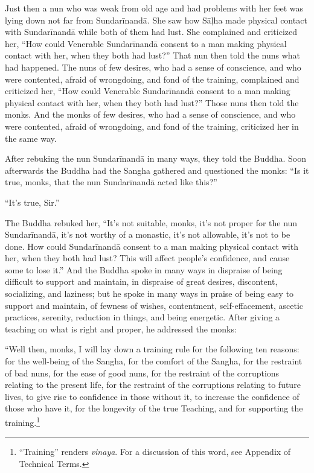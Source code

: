 \documentclass[12pt,openany]{book}%
\begin{document}
Just then a nun who was weak from old age and had problems with her feet was lying down not far from \textsanskrit{Sundarīnandā}. She saw how \textsanskrit{Sāḷha} made physical contact with \textsanskrit{Sundarīnandā} while both of them had lust. She complained and criticized her, “How could Venerable \textsanskrit{Sundarīnandā} consent to a man making physical contact with her, when they both had lust?” That nun then told the nuns what had happened. The nuns of few desires, who had a sense of conscience, and who were contented, afraid of wrongdoing, and fond of the training, complained and criticized her, “How could Venerable \textsanskrit{Sundarīnandā} consent to a man making physical contact with her, when they both had lust?” Those nuns then told the monks. And the monks of few desires, who had a sense of conscience, and who were contented, afraid of wrongdoing, and fond of the training, criticized her in the same way. 

After rebuking the nun \textsanskrit{Sundarīnandā} in many ways, they told the Buddha. Soon afterwards the Buddha had the Sangha gathered and questioned the monks: “Is it true, monks, that the nun \textsanskrit{Sundarīnandā} acted like this?” 

“It’s true, Sir.” 

The Buddha rebuked her, “It’s not suitable, monks, it’s not proper for the nun \textsanskrit{Sundarīnandā}, it’s not worthy of a monastic, it’s not allowable, it’s not to be done. How could \textsanskrit{Sundarīnandā} consent to a man making physical contact with her, when they both had lust? This will affect people’s confidence, and cause some to lose it.” And the Buddha spoke in many ways in dispraise of being difficult to support and maintain, in dispraise of great desires, discontent, socializing, and laziness; but he spoke in many ways in praise of being easy to support and maintain, of fewness of wishes, contentment, self-effacement, ascetic practices, serenity, reduction in things, and being energetic. After giving a teaching on what is right and proper, he addressed the monks: 

“Well then, monks, I will lay down a training rule for the following ten reasons: for the well-being of the Sangha, for the comfort of the Sangha, for the restraint of bad nuns, for the ease of good nuns, for the restraint of the corruptions relating to the present life, for the restraint of the corruptions relating to future lives, to give rise to confidence in those without it, to increase the confidence of those who have it, for the longevity of the true Teaching, and for supporting the training.\footnote{“Training” renders \textit{vinaya}. For a discussion of this word, see Appendix of Technical Terms. } 
\end{document}
